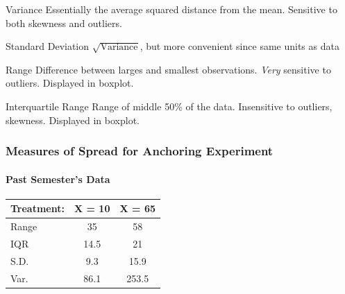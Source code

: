 \begin{frame}
\begin{block}{Variance}
Essentially the average squared distance from the mean. Sensitive to both skewness and outliers.
\end{block}
\pause
\begin{block}{Standard Deviation}
$\sqrt{\mbox{Variance}}$, but more convenient since \alert{same units as data}
\end{block}
\pause
\begin{block}{Range}
Difference between larges and smallest observations. \emph{Very} sensitive to outliers. Displayed in boxplot.
\end{block}
\pause
\begin{block}{Interquartile Range}
Range of middle 50\% of the data. Insensitive to outliers, skewness. Displayed in boxplot.
\end{block}

\end{frame}

\begin{frame}
\frametitle{Measures of Spread for Anchoring Experiment}
\framesubtitle{Past Semester's Data}

\begin{table}
	\begin{tabular}{l|cc}
	Treatment: & X = 10 & X = 65\\
	\hline
		Range&35&58\\
		IQR&14.5&21\\
		S.D.&9.3&15.9\\
		Var.&86.1&253.5
	\end{tabular}
\end{table}
\end{frame}

